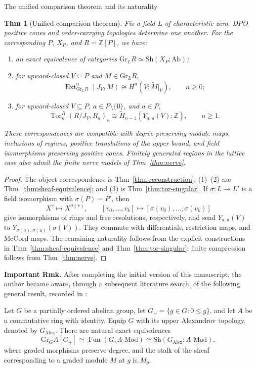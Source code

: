 \documentclass[10pt,letterpaper]{amsart}
\makeatletter
\numberwithin{equation}{section}
\newtheorem{thm}{Thm}[section]
\theoremstyle{definition}
\newcommand{\Z}{\mathbb Z}
\newcommand{\Gr}{\mathrm{Gr}}
\newcommand{\Sh}{\mathrm{Sh}}
\newcommand{\Ab}{\mathrm{Ab}}
\newcommand{\Tor}{\operatorname{Tor}}
\newcommand{\Ext}{\operatorname{Ext}}
\def\subsection{\@startsection{subsection}{2}
  \z@{.9\linespacing\@plus.3\linespacing}{.4\linespacing}
  {\normalfont\fontsize{11.5}{14}\selectfont\bfseries\boldmath\raggedright}}
\makeatother
\begin{document}
\subsection{The unified comparison theorem and its naturality}
\begin{thm}[Unified comparison theorem]\label{thm:main}
Fix a field $L$ of characteristic zero. DPO positive cones and order-carrying topologies determine one another. For the corresponding $P$, $X_P$, and $R=\Z[P]$, we have:
\begin{enumerate}
\item an exact equivalence of categories $\Gr_LR\simeq\Sh(X_P;\Ab)$;
\item for upward-closed $V\subseteq P$ and $M\in\Gr_LR$,
\[
\Ext^n_{\Gr_LR}(J_V,M)\cong H^n(V;\widetilde M|_V),\qquad n\ge0;
\]
\item for upward-closed $V\subseteq P$, $a\in P\setminus\{0\}$, and $u\in P$,
\[
\Tor_n^R(R/J_V,R_a)_u
\cong\widetilde H_{n-1}(Y_{a,u}(V);\Z),\qquad n\ge1.
\]
\end{enumerate}
These correspondences are compatible with degree-preserving module maps, inclusions of regions, positive translations of the upper bound, and field isomorphisms preserving positive cones. Finitely generated regions in the lattice case also admit the finite nerve models of Thm~\ref{thm:nerve}.
\end{thm}
\begin{proof}
The object correspondence is Thm~\ref{thm:reconstruction}; (1)--(2) are Thm~\ref{thm:sheaf-equivalence}; and (3) is Thm~\ref{thm:tor-singular}.
If $\sigma:L\to L'$ is a field isomorphism with $\sigma(P)=P'$, then
\[
X^v\mapsto X^{\sigma(v)},\qquad
[v_0,\ldots,v_k]\mapsto[\sigma(v_0),\ldots,\sigma(v_k)]
\]
give isomorphisms of rings and free resolutions, respectively, and send $Y_{a,u}(V)$ to $Y_{\sigma(a),\sigma(u)}(\sigma(V))$. They commute with differentials, restriction maps, and McCord maps. The remaining naturality follows from the explicit constructions in Thm~\ref{thm:sheaf-equivalence} and Thm~\ref{thm:tor-singular}; finite compression follows from Thm~\ref{thm:nerve}.
\end{proof}

\par\medskip
\noindent\textbf{Important Rmk.} After completing the initial version of this manuscript, the author became aware, through a subsequent literature search, of the following general result, recorded in \cite[Theorem~2.21]{BM}:

Let $G$ be a partially ordered abelian group, let $G_+=\{g\in G:0\le g\}$, and let $A$ be a commutative ring with identity. Equip $G$ with its upper Alexandrov topology, denoted by $G_{\mathrm{Alex}}$. There are natural exact equivalences
\[
\Gr_G A[G_+]
\simeq
\operatorname{Fun}(G,A\text{-}\mathrm{Mod})
\simeq
\Sh(G_{\mathrm{Alex}};A\text{-}\mathrm{Mod}),
\]
where graded morphisms preserve degree, and the stalk of the sheaf corresponding to a graded module $M$ at $g$ is $M_g$.
\end{document}
